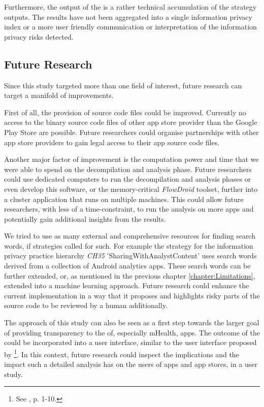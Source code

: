 Furthermore, the output of the \aiprat is a rather technical accumulation of the \sca strategy outputs.
The results have not been aggregated into a single information privacy index or a more user friendly communication or interpretation of the information privacy risks detected.

\subsection{Future Research}

Since this study targeted more than one field of interest, future research can target a manifold of improvements.

First of all, the provision of source code files could be improved. 
Currently no access to the binary source code files of other app store provider than the Google Play Store are possible.
Future researchers could organise partnerships with other app store providers to gain legal access to their app source code files.

Another major factor of improvement is the computation power and time that we were able to spend on the decompilation and analysis phase.
Future researchers could use dedicated computers to run the decompilation and analysis phases or even develop this software, or the memory-critical \textit{FlowDroid} toolset, further into a cluster application that runs on multiple machines.
This could allow future researchers, with less of a time-constraint, to run the analysis on more apps and potentially gain additional insights from the results.

We tried to use as many external and comprehensive resources for finding search words, if strategies called for such.
For example the strategy for the information privacy practice hierarchy \textit{CH35} 'SharingWithAnalystContent' uses search words derived from a collection of Android analytics apps.
These search words can be further extended, or, as mentioned in the previous chapter \ref{chapter:Limitations}, extended into a machine learning approach. 
Future research could enhance the current implementation in a way that it proposes and highlights risky parts of the source code to be reviewed by a human additionally.

The approach of this study can also be seen as a first step towards the larger goal of providing transparency to the \ipr of, especially mHealth, apps.
The outcome of the \aiprat could be incorporated into a user interface, similar to the user interface proposed by \textcite{Bruggemann2016}\footnote{See \cite{Bruggemann2016}, p. 1-10.}.
In this context, future research could inspect the implications and the impact such a detailed \ipr analysis has on the users of apps and app stores, in a user study.

